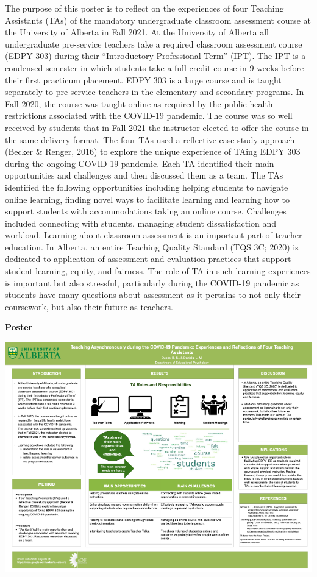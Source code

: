 \documentclass[
]{book}
\begin{document}
The purpose of this poster is to reflect on the experiences of four Teaching Assistants (TAs) of the mandatory undergraduate classroom assessment course at the University of Alberta in Fall 2021. At the University of Alberta all undergraduate pre-service teachers take a required classroom assessment course (EDPY 303) during their ``Introductory Professional Term'' (IPT). The IPT is a condensed semester in which students take a full credit course in 9 weeks before their first practicum placement. EDPY 303 is a large course and is taught separately to pre-service teachers in the elementary and secondary programs. In Fall 2020, the course was taught online as required by the public health restrictions associated with the COVID-19 pandemic. The course was so well received by students that in Fall 2021 the instructor elected to offer the course in the same delivery format. The four TAs used a reflective case study approach (Becker \& Renger, 2016) to explore the unique experience of TAing EDPY 303 during the ongoing COVID-19 pandemic. Each TA identified their main opportunities and challenges and then discussed them as a team. The TAs identified the following opportunities including helping students to navigate online learning, finding novel ways to facilitate learning and learning how to support students with accommodations taking an online course. Challenges included connecting with students, managing student dissatisfaction and workload. Learning about classroom assessment is an important part of teacher education. In Alberta, an entire Teaching Quality Standard (TQS 3C; 2020) is dedicated to application of assessment and evaluation practices that support student learning, equity, and fairness. The role of TA in such learning experiences is important but also stressful, particularly during the COVID-19 pandemic as students have many questions about assessment as it pertains to not only their coursework, but also their future as teachers.

\textbf{Poster}

\includegraphics{Content/DD.png}
\end{document}

